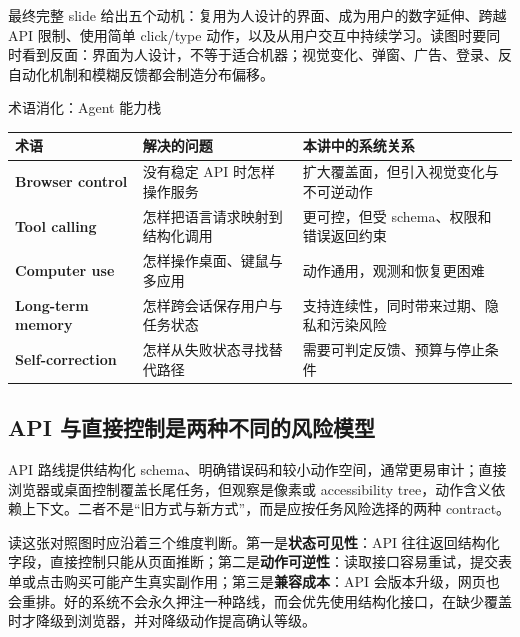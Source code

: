 最终完整 slide 给出五个动机：复用为人设计的界面、成为用户的数字延伸、跨越 API 限制、使用简单 click/type 动作，以及从用户交互中持续学习。读图时要同时看到反面：界面为人设计，不等于适合机器；视觉变化、弹窗、广告、登录、反自动化机制和模糊反馈都会制造分布偏移。



\begin{knowledgebox}{术语消化：Agent 能力栈}
\begin{tabularx}{\textwidth}{>{\bfseries}p{} X X}
术语 & 解决的问题 & 本讲中的系统关系 \\
\hline
Browser control & 没有稳定 API 时怎样操作服务 & 扩大覆盖面，但引入视觉变化与不可逆动作 \\
Tool calling & 怎样把语言请求映射到结构化调用 & 更可控，但受 schema、权限和错误返回约束 \\
Computer use & 怎样操作桌面、键鼠与多应用 & 动作通用，观测和恢复更困难 \\
Long-term memory & 怎样跨会话保存用户与任务状态 & 支持连续性，同时带来过期、隐私和污染风险 \\
Self-correction & 怎样从失败状态寻找替代路径 & 需要可判定反馈、预算与停止条件 \\
\end{tabularx}
\end{knowledgebox}

\subsection{API 与直接控制是两种不同的风险模型}

API 路线提供结构化 schema、明确错误码和较小动作空间，通常更易审计；直接浏览器或桌面控制覆盖长尾任务，但观察是像素或 accessibility tree，动作含义依赖上下文。二者不是“旧方式与新方式”，而是应按任务风险选择的两种 contract。

读这张对照图时应沿着三个维度判断。第一是\textbf{状态可见性}：API 往往返回结构化字段，直接控制只能从页面推断；第二是\textbf{动作可逆性}：读取接口容易重试，提交表单或点击购买可能产生真实副作用；第三是\textbf{兼容成本}：API 会版本升级，网页也会重排。好的系统不会永久押注一种路线，而会优先使用结构化接口，在缺少覆盖时才降级到浏览器，并对降级动作提高确认等级。

